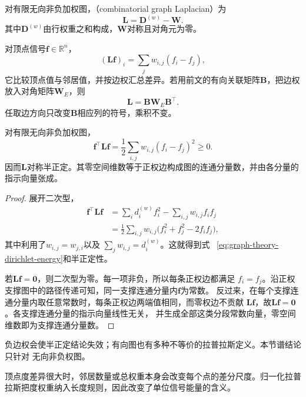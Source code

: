 \begin{definition}[组合图拉普拉斯]
\label{def:graph-theory-combinatorial-laplacian}
对有限无向非负加权图，（combinatorial graph Laplacian）为
\begin{equation}
  \bm{L}=\bm{D}^{(w)}-\bm{W}.
  \label{eq:graph-theory-combinatorial-laplacian}
\end{equation}
其中$\bm D^{(w)}$由行权重之和构成，$\bm W$对称且对角元为零。
\end{definition}
对顶点信号\(\bm{f}\in\mathbb{R}^n\)，
\[
  (\bm{L}\bm{f})_i=\sum_jw_{i,j}(f_i-f_j),
\]
它比较顶点值与邻居值，并按边权汇总差异。若用前文的有向关联矩阵\(\bm{B}\)，把边权
放入对角矩阵\(\bm{W}_E\)，则
\[
  \bm{L}=\bm{B}\bm{W}_E\bm{B}^{\top}.
\]
任取边方向只改变\(\bm{B}\)相应列的符号，乘积不变。

\begin{theorem}[图拉普拉斯的Dirichlet能量与零空间]
  \label{thm:graph-theory-laplacian-energy-nullspace}
  对有限无向非负加权图，
  \begin{equation}
    \bm{f}^{\top}\bm{L}\bm{f}
    =\frac12\sum_{i,j}w_{i,j}(f_i-f_j)^2\geq0.
    \label{eq:graph-theory-dirichlet-energy}
  \end{equation}
  因而\(\bm{L}\)对称半正定。其零空间维数等于正权边构成图的连通分量数，并由各分量的
  指示向量张成。
\end{theorem}

\begin{proof}
展开二次型，
\begin{align*}
  \bm{f}^{\top}\bm{L}\bm{f}
  &=
  \sum_i d_i^{(w)}f_i^2-\sum_{i,j}w_{i,j}f_if_j\\
  &=
  \frac12\sum_{i,j}w_{i,j}
  \bigl(f_i^2+f_j^2-2f_if_j\bigr),
\end{align*}
其中利用了\(w_{i,j}=w_{j,i}\)以及
\(\sum_jw_{i,j}=d_i^{(w)}\)。这就得到式
~\eqref{eq:graph-theory-dirichlet-energy}和半正定性。

若\(\bm{L}\bm{f}=\bm{0}\)，则二次型为零。每一项非负，所以每条正权边都满足
\(f_i=f_j\)。沿正权支撑图中的路径传递可知，同一支撑连通分量内\(\bm{f}\)为常数。
反过来，在每个支撑连通分量内取任意常数时，每条正权边两端值相同，而零权边不贡献
\(\bm{L}\bm{f}\)，故\(\bm{L}\bm{f}=\bm{0}\)。各支撑连通分量的指示向量线性无关，
并生成全部这类分段常数向量，零空间维数即为支撑连通分量数。
\end{proof}

负边权会使半正定结论失效；有向图也有多种不等价的拉普拉斯定义。本节谱结论只针对
无向非负权图。

顶点度差异很大时，邻居数量或总权重本身会改变每个点的差分尺度。归一化拉普拉斯把度权重纳入长度规则，因此改变了单位信号能量的含义。

